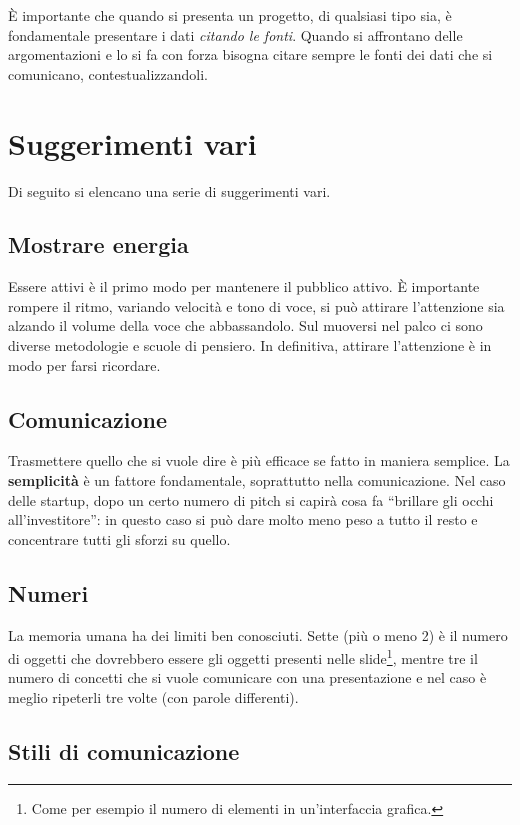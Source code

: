 È importante che quando si presenta un progetto, di qualsiasi tipo sia, è
fondamentale presentare i dati \textit{citando le fonti}.
Quando si affrontano delle argomentazioni e lo si fa con forza bisogna citare
sempre le fonti dei dati che si comunicano, contestualizzandoli.

\section{Suggerimenti vari}

Di seguito si elencano una serie di suggerimenti vari.

\subsection{Mostrare energia}

Essere attivi è il primo modo per mantenere il pubblico attivo. È importante
rompere il ritmo, variando velocità e tono di voce, si può attirare
l'attenzione sia alzando il volume della voce che abbassandolo. Sul muoversi
nel palco ci sono diverse metodologie e scuole di pensiero. In definitiva,
attirare l'attenzione è in modo per farsi ricordare.

\subsection{Comunicazione}

Trasmettere quello che si vuole dire è più efficace se fatto in maniera
semplice. La \textbf{semplicità} è un fattore fondamentale, soprattutto nella
comunicazione. Nel caso delle startup, dopo un certo numero di pitch si capirà
cosa fa ``brillare gli occhi all'investitore'': in questo caso si può dare
molto meno peso a tutto il resto e concentrare tutti gli sforzi su quello.

\subsection{Numeri}

La memoria umana ha dei limiti ben conosciuti. Sette (più o meno 2) è il numero
di oggetti che dovrebbero essere gli oggetti presenti nelle slide\footnote{Come
per esempio il numero di elementi in un'interfaccia grafica.}, mentre tre il
numero di concetti che si vuole comunicare con una presentazione e nel caso è
meglio ripeterli tre volte (con parole differenti).

\subsection{Stili di comunicazione}

